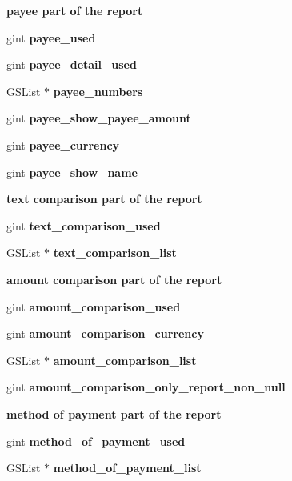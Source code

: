 \begin{Indent}{\bf payee part of the report}\par
{\em \label{_amgrpbda7ab21f99ecb7ae40f3c8598128a34}
 }\begin{DoxyCompactItemize}
\item 
gint {\bf payee\_\-used}
\item 
gint {\bf payee\_\-detail\_\-used}
\item 
GSList $\ast$ {\bf payee\_\-numbers}
\item 
gint {\bf payee\_\-show\_\-payee\_\-amount}
\item 
gint {\bf payee\_\-currency}
\item 
gint {\bf payee\_\-show\_\-name}
\end{DoxyCompactItemize}
\end{Indent}
\begin{Indent}{\bf text comparison part of the report}\par
{\em \label{_amgrp3b140157240a7fc97fcca6de2a254319}
 }\begin{DoxyCompactItemize}
\item 
gint {\bf text\_\-comparison\_\-used}
\item 
GSList $\ast$ {\bf text\_\-comparison\_\-list}
\end{DoxyCompactItemize}
\end{Indent}
\begin{Indent}{\bf amount comparison part of the report}\par
{\em \label{_amgrp132952e62e7700823167dee4cfde5d57}
 }\begin{DoxyCompactItemize}
\item 
gint {\bf amount\_\-comparison\_\-used}
\item 
gint {\bf amount\_\-comparison\_\-currency}
\item 
GSList $\ast$ {\bf amount\_\-comparison\_\-list}
\item 
gint {\bf amount\_\-comparison\_\-only\_\-report\_\-non\_\-null}
\end{DoxyCompactItemize}
\end{Indent}
\begin{Indent}{\bf method of payment part of the report}\par
{\em \label{_amgrp65bde7696c7dbafe2a9b6239e9aea912}
 }\begin{DoxyCompactItemize}
\item 
gint {\bf method\_\-of\_\-payment\_\-used}
\item 
GSList $\ast$ {\bf method\_\-of\_\-payment\_\-list}
\end{DoxyCompactItemize}
\end{Indent}


